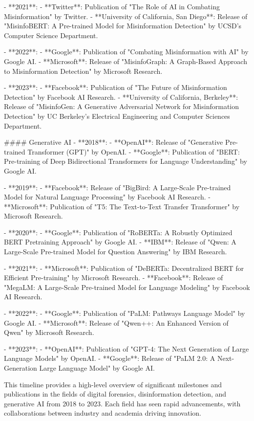 - **2021**:
  - **Twitter**: Publication of "The Role of AI in Combating Misinformation" by Twitter.
  - **University of California, San Diego**: Release of "MisinfoBERT: A Pre-trained Model for Misinformation Detection" by UCSD's Computer Science Department.

- **2022**:
  - **Google**: Publication of "Combating Misinformation with AI" by Google AI.
  - **Microsoft**: Release of "MisinfoGraph: A Graph-Based Approach to Misinformation Detection" by Microsoft Research.

- **2023**:
  - **Facebook**: Publication of "The Future of Misinformation Detection" by Facebook AI Research.
  - **University of California, Berkeley**: Release of "MisinfoGen: A Generative Adversarial Network for Misinformation Detection" by UC Berkeley's Electrical Engineering and Computer Sciences Department.

#### Generative AI
- **2018**:
  - **OpenAI**: Release of "Generative Pre-trained Transformer (GPT)" by OpenAI.
  - **Google**: Publication of "BERT: Pre-training of Deep Bidirectional Transformers for Language Understanding" by Google AI.

- **2019**:
  - **Facebook**: Release of "BigBird: A Large-Scale Pre-trained Model for Natural Language Processing" by Facebook AI Research.
  - **Microsoft**: Publication of "T5: The Text-to-Text Transfer Transformer" by Microsoft Research.

- **2020**:
  - **Google**: Publication of "RoBERTa: A Robustly Optimized BERT Pretraining Approach" by Google AI.
  - **IBM**: Release of "Qwen: A Large-Scale Pre-trained Model for Question Answering" by IBM Research.

- **2021**:
  - **Microsoft**: Publication of "DeBERTa: Decentralized BERT for Efficient Pre-training" by Microsoft Research.
  - **Facebook**: Release of "MegaLM: A Large-Scale Pre-trained Model for Language Modeling" by Facebook AI Research.

- **2022**:
  - **Google**: Publication of "PaLM: Pathways Language Model" by Google AI.
  - **Microsoft**: Release of "Qwen++: An Enhanced Version of Qwen" by Microsoft Research.

- **2023**:
  - **OpenAI**: Publication of "GPT-4: The Next Generation of Large Language Models" by OpenAI.
  - **Google**: Release of "PaLM 2.0: A Next-Generation Large Language Model" by Google AI.

This timeline provides a high-level overview of significant milestones and publications in the fields of digital forensics, disinformation detection, and generative AI from 2018 to 2023. Each field has seen rapid advancements, with collaborations between industry and academia driving innovation.